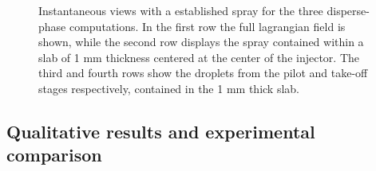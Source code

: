\begin{figure}[h!]
	\centering	{}
	\caption[Instantaneous views with a established spray for the three disperse-phase computations]{Instantaneous views with a established spray for the three disperse-phase computations. In the first row the full lagrangian field is shown, while the second row displays the spray contained within a slab of 1 mm thickness centered at the center of the injector. The third and fourth rows show the droplets from the pilot and take-off stages respectively, contained in the 1 mm thick slab.}	
	\label{fig:BIMER_LGS_spray_established_jets}
\end{figure}



\subsection{Qualitative results and experimental comparison}

